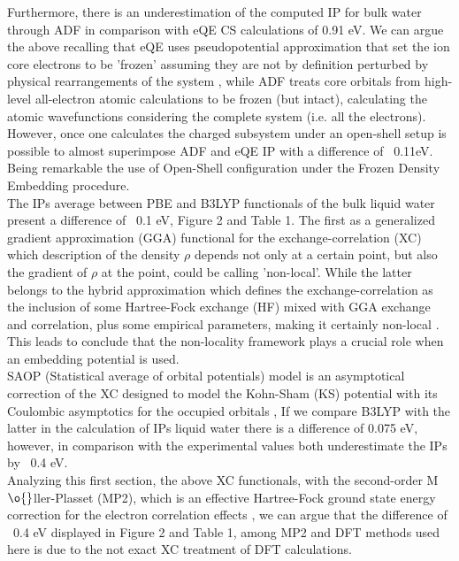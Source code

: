 \documentclass[12pt,a4paper]{article}
\begin{document}
Furthermore, there is an underestimation of the computed IP for bulk water through ADF in comparison with eQE CS calculations of 0.91
eV. We can argue the above recalling that eQE uses pseudopotential approximation that set the ion core electrons to 
be 'frozen' assuming they are not by definition perturbed by physical rearrangements of the system
\cite{srivastava1987theory}, while ADF treats core orbitals from high-level all-electron atomic calculations
to be frozen (but intact), calculating the atomic wavefunctions considering the complete system (i.e. all the
electrons)\cite{te2001chemistry}. However, once one calculates the charged subsystem under an open-shell setup
is possible to almost superimpose ADF and eQE IP with a difference of ~0.11eV. Being remarkable the use of 
Open-Shell configuration under the Frozen Density Embedding procedure.  \\

The IPs average between PBE and B3LYP functionals of the bulk liquid water present a difference of ~0.1 eV,
Figure 2 and Table 1. The first as a generalized gradient approximation (GGA) functional for the exchange-correlation
(XC) which description of the density $\rho$ depends not only at a certain point, but also the gradient of
$\rho$ at the point, could be calling 'non-local'\cite{perdew1996phys}. While the latter belongs
to the hybrid approximation which defines the exchange-correlation as the inclusion of some Hartree-Fock
exchange (HF) mixed with GGA exchange and correlation, plus some empirical parameters, making it certainly 
non-local \cite{hertwig1997parameterization}.  This leads to conclude that the non-locality framework plays a 
crucial role when an embedding potential is used. \\

SAOP (Statistical average of orbital potentials) model is an asymptotical correction of the XC designed to model
the Kohn-Sham (KS) potential with its Coulombic asymptotics for the occupied orbitals
\cite{chong2002interpretation, van2014physical},
If we compare B3LYP with the latter in the calculation of IPs liquid water there is a difference of 0.075 eV, 
however, in comparison with the experimental values both underestimate the IPs by ~0.4 eV.  \\

Analyzing this first section, the above XC functionals, with the second-order M$\o{}$ller-Plasset (MP2), 
which is an effective Hartree-Fock ground state energy correction for the electron correlation effects
\cite{del2012second}, we can argue that the difference of ~0.4 eV displayed in Figure 2 and Table 1, among MP2 and 
DFT methods used here is due to the not exact XC treatment of DFT calculations. \\
\end{document}
